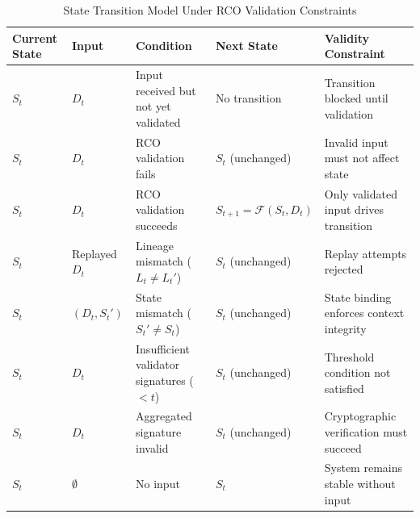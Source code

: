\begin{table}[htbp]
\footnotesize
\centering
\caption{State Transition Model Under RCO Validation Constraints}
\label{tab:state-transition}

\renewcommand{\arraystretch}{1.25}

\begin{tabularx}{\textwidth}{|p{2.5cm}|p{2.5cm}|X|p{2.5cm}|X|}
\hline
\textbf{Current State} & \textbf{Input} & \textbf{Condition} & \textbf{Next State} & \textbf{Validity Constraint} \\
\hline

$S_t$ & $D_t$ & Input received but not yet validated & No transition & Transition blocked until validation \\

\hline

$S_t$ & $D_t$ & RCO validation fails & $S_t$ (unchanged) & Invalid input must not affect state \\

\hline

$S_t$ & $D_t$ & RCO validation succeeds & $S_{t+1} = \mathcal{F}(S_t, D_t)$ & Only validated input drives transition \\

\hline

$S_t$ & Replayed $D_t$ & Lineage mismatch ($L_t \neq L_t'$) & $S_t$ (unchanged) & Replay attempts rejected \\

\hline

$S_t$ & $(D_t, S_t')$ & State mismatch ($S_t' \neq S_t$) & $S_t$ (unchanged) & State binding enforces context integrity \\

\hline

$S_t$ & $D_t$ & Insufficient validator signatures ($< t$) & $S_t$ (unchanged) & Threshold condition not satisfied \\

\hline

$S_t$ & $D_t$ & Aggregated signature invalid & $S_t$ (unchanged) & Cryptographic verification must succeed \\

\hline

$S_t$ & $\emptyset$ & No input & $S_t$ & System remains stable without input \\

\hline

\end{tabularx}
\end{table}